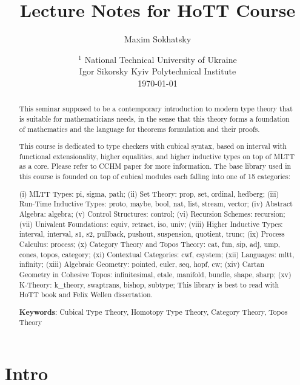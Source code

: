 \documentclass{article}
\theoremstyle{definition}
\begin{document}
\title{Lecture Notes for HoTT Course}
\author{Maxim Sokhatsky}
\date{
    $^1$ National Technical University of Ukraine \\
    \small Igor Sikorsky Kyiv Polytechnical Institute\\
    \today
}

\maketitle

\begin{abstract}

This seminar supposed to be a contemporary introduction
to modern type theory that is suitable for mathematicians needs,
in the sense that this theory forms a foundation of mathematics
and the language for theorems formulation and their proofs.

This course is dedicated to type checkers with cubical syntax, based on interval
with functional extensionality, higher equalities, and higher inductive types on
top of MLTT as a core. Please refer to CCHM paper for more information.
The base library used in this course is founded on top of cubical modules
each falling into one of 15 categories:

(i) MLTT Types: pi, sigma, path;
(ii) Set Theory: prop, set, ordinal, hedberg;
(iii) Run-Time Inductive Types: proto, maybe, bool, nat, list, stream, vector;
(iv) Abstract Algebra: algebra;
(v) Control Structures: control;
(vi) Recursion Schemes: recursion;
(vii) Univalent Foundations: equiv, retract, iso, univ;
(viii) Higher Inductive Types: interval, interval, s1, s2, pullback, pushout, suspension, quotient, trunc;
(ix) Process Calculus: process;
(x) Category Theory and Topos Theory: cat, fun, sip, adj, ump, cones, topos, category;
(xi) Contextual Categories: cwf, csystem;
(xii) Languages: mltt, infinity;
(xiii) Algebraic Geometry: pointed, euler, seq, hopf, cw;
(xiv) Cartan Geometry in Cohesive Topos: infinitesimal, etale, manifold, bundle, shape, sharp;
(xv) K-Theory: k\_theory, swaptrans, bishop, subtype;
This library is best to read with HoTT book and Felix Wellen dissertation.

{\bf Keywords}: Cubical Type Theory, Homotopy Type Theory, Category Theory, Topos Theory
\end{abstract}

\newpage
\tableofcontents
\newpage

\section*{Intro}
\end{document}
